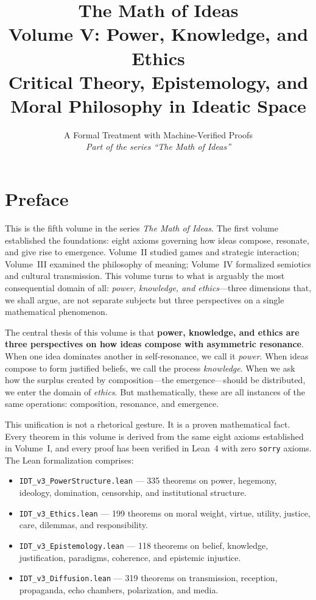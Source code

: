 \documentclass[11pt,oneside]{book}
\title{\Huge\bfseries The Math of Ideas\\[0.3em]
\LARGE Volume V: Power, Knowledge, and Ethics\\[0.5em]
\Large Critical Theory, Epistemology, and Moral Philosophy in Ideatic Space}
\author{A Formal Treatment with Machine-Verified Proofs\\[0.3em]
\normalsize\textit{Part of the series ``The Math of Ideas''}}
\date{}
\theoremstyle{plain}
\theoremstyle{definition}
\theoremstyle{remark}
\begin{document}
\maketitle

\frontmatter

\chapter*{Preface}

This is the fifth volume in the series \emph{The Math of Ideas}. The first volume
established the foundations: eight axioms governing how ideas compose, resonate,
and give rise to emergence. Volume~II studied games and strategic interaction;
Volume~III examined the philosophy of meaning; Volume~IV formalized semiotics
and cultural transmission. This volume turns to what is arguably the most
consequential domain of all: \emph{power, knowledge, and ethics}---three
dimensions that, we shall argue, are not separate subjects but three perspectives
on a single mathematical phenomenon.

The central thesis of this volume is that \textbf{power, knowledge, and ethics
are three perspectives on how ideas compose with asymmetric resonance}. When
one idea dominates another in self-resonance, we call it \emph{power}. When
ideas compose to form justified beliefs, we call the process \emph{knowledge}.
When we ask how the surplus created by composition---the emergence---should be
distributed, we enter the domain of \emph{ethics}. But mathematically, these
are all instances of the same operations: composition, resonance, and emergence.

This unification is not a rhetorical gesture. It is a proven mathematical fact.
Every theorem in this volume is derived from the same eight axioms established in
Volume~I, and every proof has been verified in Lean~4 with zero \texttt{sorry}
axioms. The Lean formalization comprises:

\begin{itemize}
\item \texttt{IDT\_v3\_PowerStructure.lean} --- 335 theorems on power, hegemony,
ideology, domination, censorship, and institutional structure.
\item \texttt{IDT\_v3\_Ethics.lean} --- 199 theorems on moral weight, virtue,
utility, justice, care, dilemmas, and responsibility.
\item \texttt{IDT\_v3\_Epistemology.lean} --- 118 theorems on belief, knowledge,
justification, paradigms, coherence, and epistemic injustice.
\item \texttt{IDT\_v3\_Diffusion.lean} --- 319 theorems on transmission,
reception, propaganda, echo chambers, polarization, and media.
\end{itemize}
\end{document}
